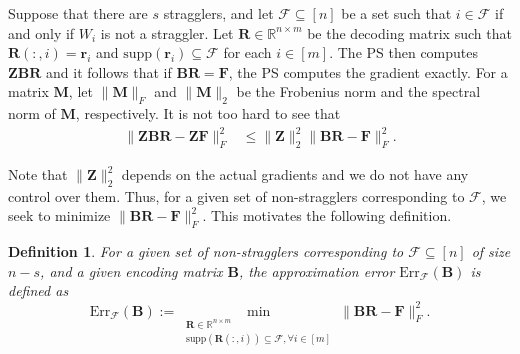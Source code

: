 \documentclass[journal,draftcls,onecolumn]{IEEEtran}
\theoremstyle{mystyle}
\newtheorem{defn}{Definition}
\newcommand{\bfB}{\mathbf{B}}
\newcommand{\bfM}{\mathbf{M}}
\newcommand{\cF}{\mathcal{F}}
\begin{document}
Suppose that there are $s$ stragglers, and let $\mathcal{F} \subseteq [n]$ be a set such that $i \in \mathcal{F}$ if and only if $W_i$ is not a straggler. Let $\mathbf{R} \in \mathbb{R}^{n \times m}$ be the decoding matrix such that $\mathbf{R}(:,i) = \mathbf{r}_i$ and $\text{supp}(\mathbf{r}_i) \subseteq \mathcal{F}$ for each $i \in [m]$. The PS then computes  $\mathbf{ZBR}$ and it follows that if $\mathbf{BR} = \mathbf{F}$, the PS computes the gradient exactly. For a matrix $\bfM$, let $\|\bfM\|_F$ and $\|\bfM\|_2$ be the Frobenius norm and the spectral norm of $\bfM$, respectively. %
It is not too hard to see that
\begin{align*}
\|\mathbf{ZBR} - \mathbf{ZF}\|_F^2 
& \leq \|\mathbf{Z}\|_2^2 \|\mathbf{BR-F}\|_F^2.
\end{align*}


Note that $\|\mathbf{Z}\|_2^2$ depends on the actual gradients and we do not have any control over them.
Thus, for a given set of non-stragglers corresponding to $\mathcal{F}$, we seek to minimize $\|\mathbf{BR-F}\|^2_F$. This motivates the following definition. 

\begin{defn}
For a given set of non-stragglers corresponding to $\cF \subseteq [n]$ of size $n-s$, and a given encoding matrix $\bfB$, the approximation error $\text{Err}_{\cF}(\bfB)$ is defined as
\begin{equation} \label{eq:ApproxError}
\text{Err}_{\cF}(\bfB) := \min\limits_{\substack{\mathbf{R}\in \mathbb{R}^{n \times m} \\ \text{supp}(\mathbf{R}(:,i)) \subseteq \mathcal{F},  \forall i \in [m]}}  {\|\mathbf{B} \mathbf{R}- \mathbf{F}\|_F^2}.
\end{equation}
\end{defn}
\end{document}
